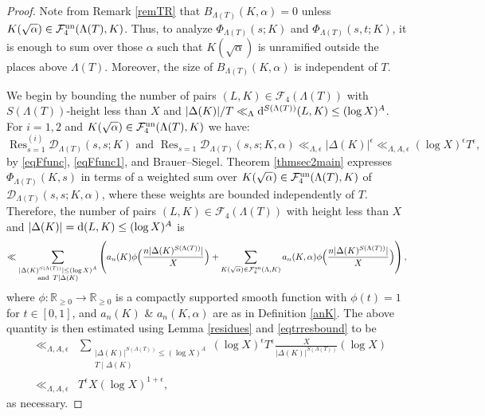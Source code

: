 \documentclass[10pt]{article}
\theoremstyle{plain}
\theoremstyle{definition}
\theoremstyle{remark}
\DeclareMathOperator{\Res}{Res}
\def\T{{\mathcal T}}
\def\un{{\rm un}}
\def\R{{\mathbb R}}
\def\FF{{\mathcal F}}
\def\cD{{\mathcal D}}
\newcommand{\D}{{\rm d}}
\begin{document}
\begin{proof}
Note from Remark \ref{remTR} that $B_{\Lambda(T)}(K,\alpha)=0$ unless
$K(\sqrt{\alpha})\in\FF_4^\un(\Lambda(T),K)$. Thus, to analyze
$\Phi_{\Lambda(T)}(s;K)$ and $\Phi_{\Lambda(T)}(s,t;K)$, it is enough
to sum over those $\alpha$ such that $K(\sqrt{\alpha})$ is unramified
outside the places above $\Lambda(T)$. Moreover, the size of
$B_{\Lambda(T)}(K,\alpha)$ is independent of $T$.

We begin by bounding the number of pairs $(L,K)\in\FF_4(\Lambda(T))$
with $S(\Lambda(T))$-height less than $X$ and $|\Delta(K)|/T\ll_\Lambda
\D^{S(\Lambda(T))}(L,K)\leq (\log X)^A$.  For $i=1,2$ and $K(\sqrt{\alpha})\in
\FF_4^\un(\Lambda(T),K)$ we have:
\begin{equation}\label{eqtrresbound}
  \Res_{s=1}^{(i)} \cD_{\Lambda(T)}(s,s;K) \mbox{ and } \Res_{s=1} \cD_{\Lambda(T)}(s,s;K,\alpha)
  \ll_{\Lambda,\epsilon} |\Delta(K)|^\epsilon\ll_{\Lambda,A,\epsilon} (\log X)^\epsilon T^\epsilon,
\end{equation}
by \eqref{eqFfunc}, \eqref{eqFfunc1}, and Brauer--Siegel.
Theorem \ref{thmsec2main} expresses $\Phi_{\Lambda(T)}(K,s)$ in terms
of a weighted sum over $K(\sqrt{\alpha})\in\FF_4^\un(\Lambda(T),K)$ of
$\cD_{\Lambda(T)}(s,s;K,\alpha)$, where these weights are bounded
independently of $T$. Therefore, the number of pairs
$(L,K)\in\FF_4(\Lambda(T))$ with height less than $X$ and
$|\Delta(K)|=\D(L,K)\leq (\log X)^A$ is
\begin{equation*}
\ll\sum_{\substack{|\Delta(K)^{S(\Lambda(T))}|\leq (\log X)^A\\\text{and }\, T\mid\Delta(K)}}
\left(a_n(K)\phi\Bigl(\frac{n|\Delta(K)^{S(\Lambda(T))}|}{X}\Bigr)
+\sum_{K(\sqrt{\alpha})\in\FF_4^\un(\Lambda,K)}a_n(K,\alpha)\phi\Bigl(
\frac{n|\Delta(K)^{S(\Lambda(T))}|}{X}\Bigr)\right),
\end{equation*}
where $\phi:\R_{\geq 0}\to\R_{\geq 0}$ is a compactly supported smooth
function with $\phi(t)=1$ for $t\in[0,1]$, and $a_n(K)$ \& $a_n(K,\alpha)$ are as in Definition \ref{anK}. The above quantity is then
estimated using Lemma \ref{residues} and \eqref{eqtrresbound} to be
\begin{equation*}
\begin{array}{rcl}
&\ll_{\Lambda,A,\epsilon}&\displaystyle
\sum_{\substack{|\Delta(K)|^{S(\Lambda(T))}\leq (\log X)^A\\T\mid\Delta(K)}}
(\log X)^\epsilon T^\epsilon \frac{X}{|\Delta(K)|^{S(\Lambda(T))}}(\log X)
\\[.2in]&\ll_{\Lambda,A,\epsilon}&\displaystyle
T^\epsilon X(\log X)^{1+\epsilon},
\end{array}
\end{equation*}
as necessary.


\end{proof}
\end{document}
